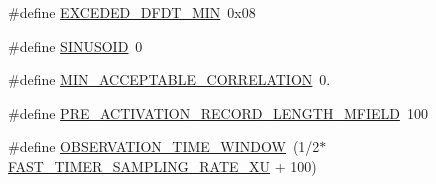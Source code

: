 \begin{DoxyCompactItemize}
\item 
\#define \hyperlink{a00019_a7bccfba89f8c2aedefd2d67e2a1c475e}{E\+X\+C\+E\+D\+E\+D\+\_\+\+D\+F\+D\+T\+\_\+\+M\+I\+N}~0x08
\item 
\#define \hyperlink{a00019_a8956b2c85796334b2f0617ebd3cf9a52}{S\+I\+N\+U\+S\+O\+I\+D}~0
\item 
\#define \hyperlink{a00019_ae577db27e9b0eec218f9b0b74015043a}{M\+I\+N\+\_\+\+A\+C\+C\+E\+P\+T\+A\+B\+L\+E\+\_\+\+C\+O\+R\+R\+E\+L\+A\+T\+I\+O\+N}~0.
\item 
\#define \hyperlink{a00019_a016beb9ae543c41bbe4c8cefe6a4e690}{P\+R\+E\+\_\+\+A\+C\+T\+I\+V\+A\+T\+I\+O\+N\+\_\+\+R\+E\+C\+O\+R\+D\+\_\+\+L\+E\+N\+G\+T\+H\+\_\+\+M\+F\+I\+E\+L\+D}~100
\item 
\#define \hyperlink{a00019_a2fb6f38d16f4ccb6a19773d6a254f512}{O\+B\+S\+E\+R\+V\+A\+T\+I\+O\+N\+\_\+\+T\+I\+M\+E\+\_\+\+W\+I\+N\+D\+O\+W}~(1/2$\ast$\hyperlink{a00021_a87ea9a0eaa474d8b8f672cfa5cbb091f}{F\+A\+S\+T\+\_\+\+T\+I\+M\+E\+R\+\_\+\+S\+A\+M\+P\+L\+I\+N\+G\+\_\+\+R\+A\+T\+E\+\_\+\+X\+U} + 100)
\end{DoxyCompactItemize}
